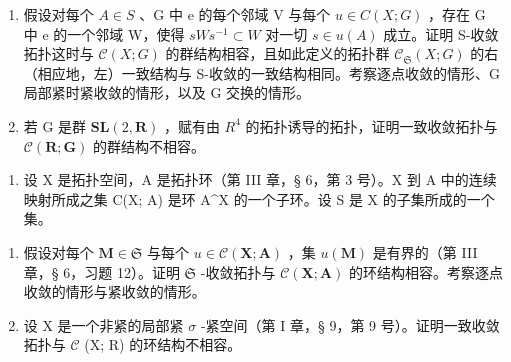 \begin{enumerate}
\def\labelenumi{\alph{enumi})}
\item
  假设对每个 \(A \in S\) 、G 中 e 的每个邻域 V 与每个 \(u \in C(X; G)\) ，存在 G 中 e 的一个邻域 W，使得 \(sWs^{-1} \subset W\) 对一切 \(s \in u(A)\) 成立。证明 S-收敛拓扑这时与 \(\mathcal{C}(X; G)\) 的群结构相容，且如此定义的拓扑群 \(\mathcal{C}_{\mathfrak{S}}(X; G)\) 的右（相应地，左）一致结构与 S-收敛的一致结构相同。考察逐点收敛的情形、G 局部紧时紧收敛的情形，以及 G 交换的情形。
\item
  若 G 是群 \(\mathbf{SL}(2, \mathbf{R})\) ，赋有由 \(R^{4}\) 的拓扑诱导的拓扑，证明一致收敛拓扑与 \(\mathcal{C}(\mathbf{R}; \mathbf{G})\) 的群结构不相容。
\end{enumerate}

\begin{enumerate}
\def\labelenumi{\arabic{enumi})}
\setcounter{enumi}{11}
\tightlist
\item
  设 X 是拓扑空间，A 是拓扑环（第 III 章，§ 6，第 3 号）。X 到 A 中的连续映射所成之集 C(X; A) 是环 A\^{}X 的一个子环。设 S 是 X 的子集所成的一个集。
\end{enumerate}

\begin{enumerate}
\def\labelenumi{\alph{enumi})}
\item
  假设对每个 \(\mathbf{M} \in \mathfrak{S}\) 与每个 \(u \in \mathcal{C}(\mathbf{X}; \mathbf{A})\) ，集 \(u(\mathbf{M})\) 是有界的（第 III 章，§ 6，习题 12）。证明 \(\mathfrak{S}\) -收敛拓扑与 \(\mathcal{C}(\mathbf{X}; \mathbf{A})\) 的环结构相容。考察逐点收敛的情形与紧收敛的情形。
\item
  设 X 是一个非紧的局部紧 \(\sigma\) -紧空间（第 I 章，§ 9，第 9 号）。证明一致收敛拓扑与 \(\mathcal{C}\) (X; R) 的环结构不相容。
\end{enumerate}


